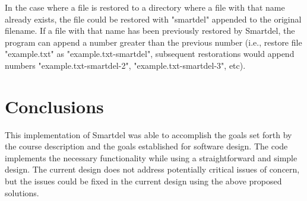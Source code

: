 \documentclass[12pt]{article}
\begin{document}
In the case where a file is restored to a directory where a file with that name already exists, the file could be restored with "smartdel"
appended to the original filename. If a file with that name has been previously restored by Smartdel, the program can append a number
greater than the previous number (i.e., restore file "example.txt" as "example.txt-smartdel", subsequent restorations would append
numbers "example.txt-smartdel-2", "example.txt-smartdel-3", etc).
\section{Conclusions}
\thispagestyle{empty}
This implementation of Smartdel was able to accomplish the goals set forth by the course description and the goals established for
software design. The code implements the necessary functionality while using a straightforward and simple design. The current design
does not address potentially critical issues of concern, but the issues could be fixed in the current design using the above proposed
solutions.
\end{document}
